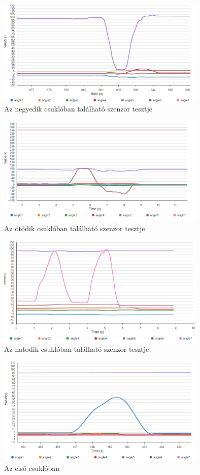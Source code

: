 \begin{figure}[!ht]
\centering
\includegraphics[width=100mm, keepaspectratio]{figures/Csuklo_szog_teszt/5}
\caption{Az negyedik csuklóban található szenzor tesztje}
\label{fig:csuklo_teszt_5}
\end{figure}

\begin{figure}[!ht]
\centering
\includegraphics[width=100mm, keepaspectratio]{figures/Csuklo_szog_teszt/6}
\caption{Az ötödik csuklóban található szenzor tesztje}
\label{fig:csuklo_teszt_6}
\end{figure}

\begin{figure}[!ht]
\centering
\includegraphics[width=100mm, keepaspectratio]{figures/Csuklo_szog_teszt/7}
\caption{Az hatodik csuklóban található szenzor tesztje}
\label{fig:csuklo_teszt_7}
\end{figure}

\begin{figure}[!ht]
\centering
\includegraphics[width=100mm, keepaspectratio]{figures/Csuklo_szog_teszt/1}
\caption{Az első csuklóban}
\label{fig:csuklo_teszt_1}
\end{figure}

